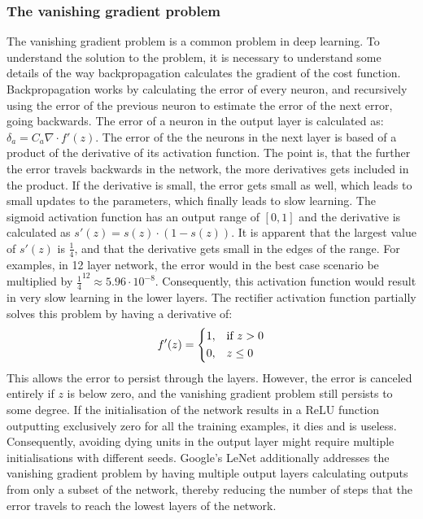 \subsubsection{The vanishing gradient problem}
\label{sec:vanishinggradient}
The vanishing gradient problem is a common problem in deep learning. To understand the solution to the problem, it is necessary to understand some details of the way backpropagation calculates the gradient of the cost function.
Backpropagation works by calculating the error of every neuron, and recursively using the error of the previous neuron to estimate the error of the next error, going backwards. The error of a neuron in the output layer is calculated as: ${\delta}_a = C_a \nabla \cdot f'(z)$. The error of the the neurons in the next layer is based of a product of the derivative of its activation function. The point is, that the further the error travels backwards in the network, the more derivatives gets included in the product. If the derivative is small, the error gets small as well, which leads to small updates to the parameters, which finally leads to slow learning. The sigmoid activation function has an output range of $[0,1]$ and the derivative is calculated as $s'(z) = s(z) \cdot (1-s(z))$. It is apparent that the largest value of $s'(z)$ is $\frac{1}{4}$, and that the derivative gets small in the edges of the range. For examples, in 12 layer network, the error would in the best case scenario be multiplied by ${\frac{1}{4}}^{12} \approx 5.96 \cdot 10^{-8}$. Consequently, this activation function would result in very slow learning in the lower layers. The rectifier activation function partially solves this problem by having a derivative of:
\[
    f'(z) =  
\begin{dcases}
    1,& \text{if } z > 0\\
    0,              & z \leq 0
\end{dcases}
\]
This allows the error to persist through the layers. However, the error is canceled entirely if $z$ is below zero, and the vanishing gradient problem still persists to some degree. If the initialisation of the network results in a ReLU function outputting exclusively zero for all the training examples, it dies and is useless. Consequently, avoiding dying units in the output layer might require multiple initialisations with different seeds. Google's LeNet \cite{christian} additionally addresses the vanishing gradient problem by having multiple output layers calculating outputs from only a subset of the network, thereby reducing the number of steps that the error travels to reach the lowest layers of the network.

